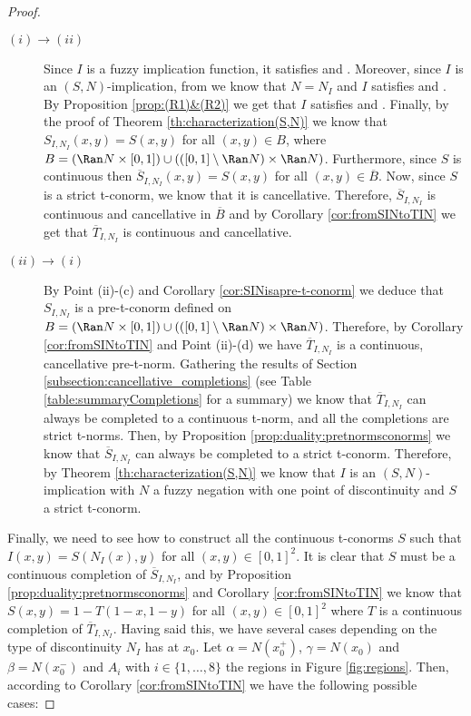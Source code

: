 \begin{proof}\hspace{0.5cm}
	\begin{description}
		\item[$(i) \to (ii)$]  Since $I$ is a fuzzy implication function, it satisfies \Ione and \Itwo. Moreover, since $I$ is an $(S,N)$-implication, from \cite[Proposition 2.4.3]{Baczynski2008} we know that $N=N_I$ and $I$ satisfies \NP and \EP. By Proposition \ref{prop:(R1)&(R2)} we get that $I$ satisfies \Rone and \Rtwo. Finally, by the proof of Theorem \ref{th:characterization(S,N)} we know that $S_{I,N_I}(x,y)=S(x,y)$ for all $(x,y) \in B$, where $B=(\Ran N \times [0,1]) \cup (([0,1] \setminus \Ran N) \times \Ran N)$. Furthermore, since $S$ is continuous then $\overline{S}_{I,N_I}(x,y)=S(x,y)$ for all $(x,y) \in \overline{B}$. Now, since $S$ is a strict t-conorm, we know that it is cancellative. Therefore, $\overline{S}_{I,N_I}$ is continuous and cancellative in $\overline{B}$ and by Corollary \ref{cor:fromSINtoTIN} we get that $\overline{T}_{I,N_I}$ is continuous and cancellative.
		\item[$(ii) \to (i)$] By Point (ii)-(c) and Corollary \ref{cor:SINisapre-t-conorm} we deduce that $S_{I,N_I}$ is a pre-t-conorm defined on $B=(\Ran N \times [0,1]) \cup (([0,1] \setminus \Ran N) \times \Ran N)$. Therefore, by Corollary \ref{cor:fromSINtoTIN} and Point (ii)-(d) we have $\overline{T}_{I,N_I}$ is a continuous, cancellative pre-t-norm. Gathering the results of Section \ref{subsection:cancellative_completions} (see Table \ref{table:summaryCompletions} for a summary) we know that $\overline{T}_{I,N_I}$ can always be completed to a continuous t-norm, and all the completions are strict t-norms. Then, by Proposition \ref{prop:duality:pretnormsconorms} we know that $\overline{S}_{I,N_I}$ can always be completed to a strict t-conorm. Therefore, by Theorem \ref{th:characterization(S,N)} we know that $I$ is an $(S,N)$-implication with $N$ a fuzzy negation with one point of discontinuity and $S$ a strict t-conorm.
	\end{description}
Finally, we need to see how to construct all the continuous t-conorms $S$ such that $I(x,y)=S(N_I(x),y)$ for all $(x,y) \in [0,1]^2$. It is clear that $S$ must be a continuous completion of  $\overline{S}_{I,N_I}$, and by Proposition \ref{prop:duality:pretnormsconorms} and Corollary \ref{cor:fromSINtoTIN} we know that $S(x,y)=1-T(1-x,1-y)$ for all $(x,y) \in [0,1]^2$ where $T$ is a continuous completion of $\overline{T}_{I,N_I}$. Having said this, we have several cases depending on the type of discontinuity $N_I$ has at $x_0$. Let  $\alpha=N(x_0^{+})$, $\gamma=N(x_0)$ and $\beta=N(x_0^{-})$ and $A_i$ with $i \in \{1,\dots,8\}$ the regions in Figure \ref{fig:regions}. Then, according to Corollary \ref{cor:fromSINtoTIN} we have the following possible cases:

\end{proof}
